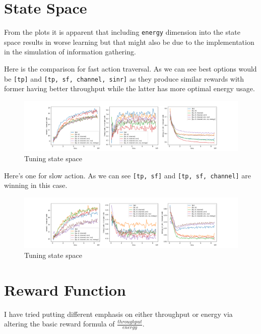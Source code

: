 \section{State Space}
From the plots it is apparent that including 
\texttt{energy} dimension into the state space results in worse learning but that might also be due to the implementation in the simulation of information 
gathering.

Here is the comparison for fast action traversal. As we can see best options would
be \texttt{[tp]} and \texttt{[tp, sf, channel, sinr]} as they
produce similar rewards with former having 
better throughput while the latter has more optimal energy usage. 

\begin{figure}[H]
\centering
\hspace*{-3.3cm}  
\includegraphics[scale=0.40]{plots/state_space/state_space_hypertuning_deep_q_SMALL.png}
  \caption{Tuning state space}
\end{figure}

Here's one for slow action. As we can see \texttt{[tp, sf]} and
\texttt{[tp, sf, channel]} are winning in this case.

\begin{figure}[H]
\centering
\hspace*{-3.3cm}  
\includegraphics[scale=0.40]{plots/state_space/state_space_slow_action_hypertuning_deep_q_SMALL.png}
  \caption{Tuning state space}
\end{figure}

\section{Reward Function}

I have tried putting different emphasis on either 
throughput or energy via altering the basic reward formula of $\frac{throughput}{energy}$. \\

